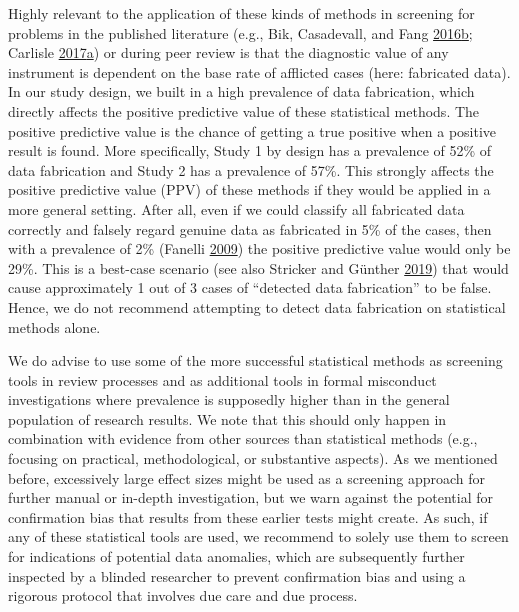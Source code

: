 \documentclass[a5paper]{book}
\begin{document}
Highly relevant to the application of these kinds of methods in
screening for problems in the published literature (e.g., Bik,
Casadevall, and Fang
\protect\hyperlink{ref-doi:10.1128ux2fmBio.00809-16}{2016}\protect\hyperlink{ref-doi:10.1128ux2fmBio.00809-16}{b};
Carlisle
\protect\hyperlink{ref-doi:10.1111ux2fanae.13938}{2017}\protect\hyperlink{ref-doi:10.1111ux2fanae.13938}{a})
or during peer review is that the diagnostic value of any instrument is
dependent on the base rate of afflicted cases (here: fabricated data).
In our study design, we built in a high prevalence of data fabrication,
which directly affects the positive predictive value of these
statistical methods. The positive predictive value is the chance of
getting a true positive when a positive result is found. More
specifically, Study 1 by design has a prevalence of 52\% of data
fabrication and Study 2 has a prevalence of 57\%. This strongly affects
the positive predictive value (PPV) of these methods if they would be
applied in a more general setting. After all, even if we could classify
all fabricated data correctly and falsely regard genuine data as
fabricated in 5\% of the cases, then with a prevalence of 2\% (Fanelli
\protect\hyperlink{ref-doi:10.1371ux2fjournal.pone.0005738}{2009}) the
positive predictive value would only be 29\%. This is a best-case
scenario (see also Stricker and Günther
\protect\hyperlink{ref-doi:10.1027ux2f2151-2604ux2fa000356}{2019}) that
would cause approximately 1 out of 3 cases of \enquote{detected data
fabrication} to be false. Hence, we do not recommend attempting to
detect data fabrication on statistical methods alone.

We do advise to use some of the more successful statistical methods as
screening tools in review processes and as additional tools in formal
misconduct investigations where prevalence is supposedly higher than in
the general population of research results. We note that this should
only happen in combination with evidence from other sources than
statistical methods (e.g., focusing on practical, methodological, or
substantive aspects). As we mentioned before, excessively large effect
sizes might be used as a screening approach for further manual or
in-depth investigation, but we warn against the potential for
confirmation bias that results from these earlier tests might create. As
such, if any of these statistical tools are used, we recommend to solely
use them to screen for indications of potential data anomalies, which
are subsequently further inspected by a blinded researcher to prevent
confirmation bias and using a rigorous protocol that involves due care
and due process.
\end{document}
